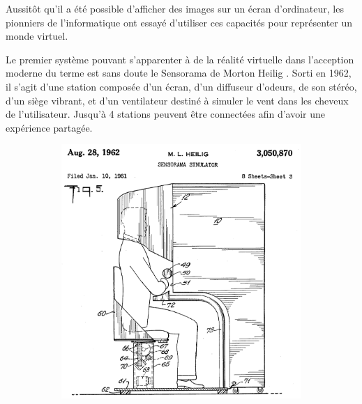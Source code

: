\documentclass[a4,12pt]{scrartcl}
\begin{document}
Aussitôt qu'il a été possible d'afficher des images sur un écran d'ordinateur, les pionniers de l'informatique ont essayé d'utiliser ces capacités pour représenter un monde virtuel.

Le premier système pouvant s'apparenter à de la réalité virtuelle dans l'acception moderne du terme est sans doute le Sensorama de Morton Heilig \cite{Sensorama}. Sorti en 1962, il s'agit d'une station composée d'un écran, d'un diffuseur d'odeurs, de son stéréo, d'un siège vibrant, et d'un ventilateur destiné à simuler le vent dans les cheveux de l'utilisateur. Jusqu'à 4 stations peuvent être connectées afin d'avoir une expérience partagée.

\begin{figure}[H]
	\centering
	\begin{subfigure}{.4\textwidth}
	  \centering
	  \includegraphics[width=\linewidth]{sensorama-patent}
	\end{subfigure}
	~
	\begin{subfigure}{.4\textwidth}
	  \centering

\end{subfigure}
\end{figure}
\end{document}
